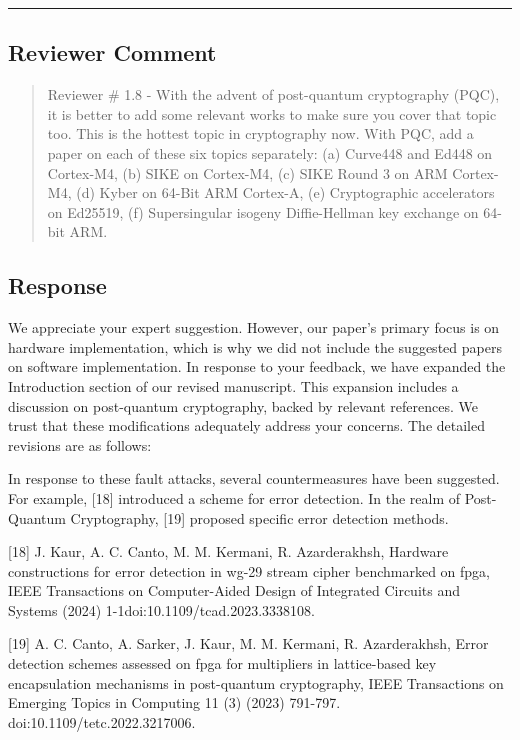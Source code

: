 \color{black}

\noindent\rule{\linewidth}{2.0pt}

\subsection{Reviewer Comment}
\begin{mdframed}
	\begin{quote}
		Reviewer \# 1.8 - With the advent of post-quantum cryptography (PQC), it is better to add some relevant works to make sure you cover that topic too. This is the hottest topic in cryptography now. With PQC, add a paper on each of these six topics separately: (a) Curve448 and Ed448 on Cortex-M4, (b) SIKE on Cortex-M4, (c) SIKE Round 3 on ARM Cortex-M4, (d) Kyber on 64-Bit ARM Cortex-A, (e) Cryptographic accelerators on Ed25519, (f) Supersingular isogeny Diffie-Hellman key exchange on 64-bit ARM.
	\end{quote}
\end{mdframed}

\subsection{Response}


We appreciate your expert suggestion. However, our paper's primary focus is on hardware implementation, which is why we did not include the suggested papers on software implementation. In response to your feedback, we have expanded the Introduction section of our revised manuscript. This expansion includes a discussion on post-quantum cryptography, backed by relevant references. We trust that these modifications adequately address your concerns. The detailed revisions are as follows:

\color{blue}

In response to these fault attacks, several countermeasures have been suggested. For example, [18] introduced a scheme for error detection. In the realm of Post-Quantum Cryptography, [19] proposed specific error detection methods.

	[18] J. Kaur, A. C. Canto, M. M. Kermani, R. Azarderakhsh, Hardware constructions for error detection in wg-29 stream cipher benchmarked on fpga, IEEE Transactions on Computer-Aided Design of Integrated Circuits and Systems (2024) 1-1doi:10.1109/tcad.2023.3338108.

[19] A. C. Canto, A. Sarker, J. Kaur, M. M. Kermani, R. Azarderakhsh, Error detection schemes assessed on fpga for multipliers in lattice-based key encapsulation mechanisms in post-quantum cryptography, IEEE Transactions on Emerging Topics in Computing 11 (3) (2023) 791-797. doi:10.1109/tetc.2022.3217006.

